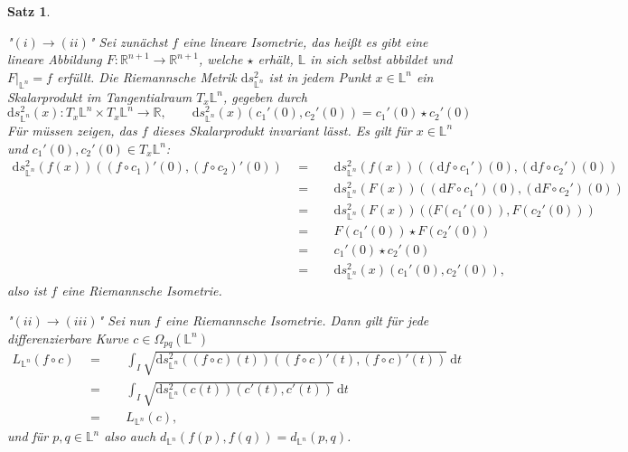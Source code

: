 \documentclass[11pt]{book}
\numberwithin{dummy}{section}
\newtheorem{theorem}{Satz}[section]
\theoremstyle{nonumberbreak}
\newenvironment{pr}[1][]{\ifthenelse{\equal{#1}{}}{\proof}{\proof[#1]}\rm}{\endproof}
\newcommand{\Loid}{\mathbb{L}}
\newcommand{\R}{\mathbb{R}}
\newcommand{\la}{\longrightarrow}
\begin{document}
\begin{spacing}{1.4}
\begin{theorem}
\begin{pr}
\begin{compactenum}
\item["$(i) \rightarrow (ii)$"] Sei zunächst $f$ eine lineare Isometrie, das heißt es gibt eine lineare Abbildung $F: \R^{n+1} \la \R^{n+1}$, welche $\star$ erhält, $\Loid$ in sich selbst abbildet und $F\vert_{\Loid^n} = f$ erfüllt. Die Riemannsche Metrik $\mathrm{d}s^{2}_{\Loid^n}$ ist in jedem Punkt $x \in \Loid^n$ ein Skalarprodukt im Tangentialraum $T_x\Loid^n$, gegeben durch 
$$\mathrm{d}s^2_{\Loid^n}(x): T_x\Loid^n \times T_x\Loid^n \la \R, \qquad \mathrm{d}s_{\Loid^n}^2(x)(c_1'(0), c_2'(0)) =  c_1'(0) \star c_2'(0)$$
Für müssen zeigen, das $f$ dieses Skalarprodukt invariant lässt. Es gilt für $x \in \Loid^n$ und $c_1'(0), c_2'(0) \in T_x\Loid^n$:
\begin{alignat*}{5}
\mathrm{d}s^2_{\Loid^n}\left( f(x)\right) \left( (f \circ c_1)'(0), (f \circ c_2)'(0)\right) \ \ &=&& \ \ \mathrm{d}s^2_{\Loid^n} \left( f(x)\right) \left( (\mathrm{d}f \circ c_1')(0), (\mathrm{d}f\circ c_2')(0) \right) \\
&=&& \ \ \mathrm{d}s^2_{\Loid^n}\left( F(x)\right)\left( (\mathrm{d}F \circ c_1')(0), (\mathrm{d}F\circ c_2')(0) \right) \\
&=&& \ \ \mathrm{d}s^2_{\Loid^n}\left( F(x)\right)\left( (F ( c_1'(0)), F(c_2'(0)) \right) \\
&=&& \ \ F(c_1'(0)) \star F(c_2'(0)) \\
&=&& \ \ c_1'(0) \star c_2'(0) \\
&=&& \ \ \mathrm{d}s_{\Loid^n}^2(x)(c_1'(0), c_2'(0)),
\end{alignat*}
also ist $f$ eine Riemannsche Isometrie.
\item["$(ii)\rightarrow (iii)$"] Sei nun $f$ eine Riemannsche Isometrie. Dann gilt für jede differenzierbare Kurve $c \in \Omega_{pq}(\Loid^n)$
\begin{alignat*}{5}
L_{\Loid^n}(f \circ c) \ \ &=&& \ \ \int_I \sqrt{\mathrm{d}s^2_{\Loid^n}\left( (f \circ c)(t)\right)\left( (f \circ c)'(t), (f \circ c)'(t) \right)} \ \mathrm{d}t \\
&=&& \ \ \int_I \sqrt{ \mathrm{d}s_{\Loid^n}^2 \left( c(t)\right) \left( c'(t), c'(t)\right) } \ \mathrm{d} t\\
&=&& \ \ L_{\Loid^n}(c),
\end{alignat*}
und für $p,q \in \Loid^n$ also auch 
$d_{\Loid^n}(f(p), f(q)) = d_{\Loid^n}(p,q)$.
\end{compactenum}


\end{pr}
\end{theorem}
\end{spacing}
\end{document}
